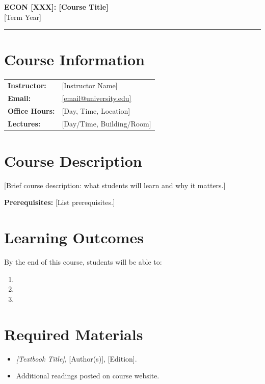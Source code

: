 \documentclass[11pt]{article}
\makeatletter
\newcommand{\COURSE}{ECON [XXX]}
\newcommand{\COURSETITLE}{[Course Title]}
\newcommand{\TERM}{[Term Year]}
\newcommand{\INSTRUCTOR}{[Instructor Name]}
\newcommand{\EMAIL}{[email@university.edu]}
\newcommand{\OFFICEHOURS}{[Day, Time, Location]}
\newcommand{\LECTURES}{[Day/Time, Building/Room]}
\makeatother
\begin{document}
\begin{center}
  {\LARGE\bfseries \COURSE: \COURSETITLE}\\[0.4em]
  {\large \TERM}
\end{center}
\medskip\hrule\medskip

\section*{Course Information}

\begin{tabular}{@{}ll}
  \textbf{Instructor:}    & \INSTRUCTOR \\
  \textbf{Email:}         & \href{mailto:\EMAIL}{\EMAIL} \\
  \textbf{Office Hours:}  & \OFFICEHOURS \\
  \textbf{Lectures:}      & \LECTURES \\
\end{tabular}

\section*{Course Description}

[Brief course description: what students will learn and why it matters.]

\textbf{Prerequisites:} [List prerequisites.]

\section*{Learning Outcomes}

By the end of this course, students will be able to:
\begin{enumerate}
  \item [Outcome 1.]
  \item [Outcome 2.]
  \item [Outcome 3.]
\end{enumerate}

\section*{Required Materials}

\begin{itemize}
  \item \textit{[Textbook Title]}, [Author(s)], [Edition].
  \item Additional readings posted on course website.
\end{itemize}
\end{document}
